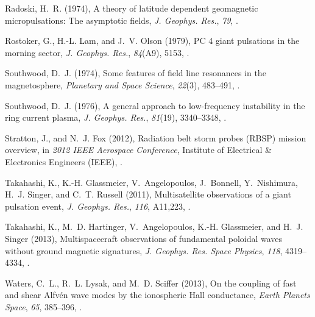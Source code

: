 \documentclass[draft,linenumbers]{agujournal}
\begin{document}
\begin{thebibliography}{50}
Radoski, H.~R. (1974), A theory of latitude dependent geomagnetic
  micropulsations: The asymptotic fields, \textit{J. Geophys. Res.},
  \textit{79}, .

Rostoker, G., H.-L. Lam, and J.~V. Olson (1979), {PC 4} giant pulsations in the
  morning sector, \textit{J. Geophys. Res.}, \textit{84}(A9), 5153,
  .

Southwood, D.~J. (1974), Some features of field line resonances in the
  magnetosphere, \textit{Planetary and Space Science}, \textit{22}(3),
  483--491, .

Southwood, D.~J. (1976), A general approach to low-frequency instability in the
  ring current plasma, \textit{J. Geophys. Res.}, \textit{81}(19), 3340--3348,
  .

Stratton, J., and N.~J. Fox (2012), Radiation belt storm probes ({RBSP})
  mission overview, in \textit{2012 {IEEE} Aerospace Conference}, Institute of
  Electrical {\&} Electronics Engineers ({IEEE}),
  .

Takahashi, K., K.-H. Glassmeier, V.~Angelopoulos, J.~Bonnell, Y.~Nishimura,
  H.~J. Singer, and C.~T. Russell (2011), Multisatellite observations of a
  giant pulsation event, \textit{J. Geophys. Res.}, \textit{116}, A11,223,
  .

Takahashi, K., M.~D. Hartinger, V.~Angelopoulos, K.-H. Glassmeier, and H.~J.
  Singer (2013), Multispacecraft observations of fundamental poloidal waves
  without ground magnetic signatures, \textit{J. Geophys. Res. Space Physics},
  \textit{118}, 4319--4334, .

Waters, C.~L., R.~L. Lysak, and M.~D. Sciffer (2013), On the coupling of fast
  and shear {Alfv{\'e}n} wave modes by the ionospheric {Hall} conductance,
  \textit{Earth Planets Space}, \textit{65}, 385--396,
  .


\end{thebibliography}
\end{document}
